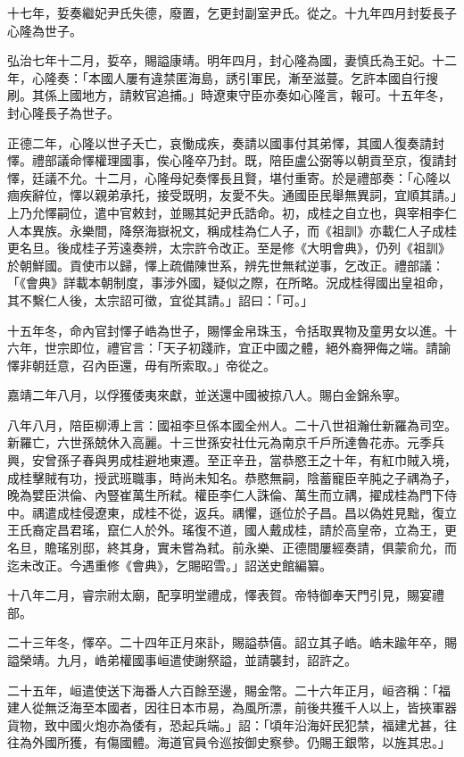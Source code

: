 \begin{pinyinscope}
十七年，娎奏繼妃尹氏失德，廢置，乞更封副室尹氏。從之。十九年四月封娎長子心隆為世子。

弘治七年十二月，娎卒，賜謚康靖。明年四月，封心隆為國，妻慎氏為王妃。十二年，心隆奏：「本國人屢有違禁匿海島，誘引軍民，漸至滋蔓。乞許本國自行搜刷。其係上國地方，請敕官追捕。」時遼東守臣亦奏如心隆言，報可。十五年冬，封心隆長子為世子。

正德二年，心隆以世子夭亡，哀慟成疾，奏請以國事付其弟懌，其國人復奏請封懌。禮部議命懌權理國事，俟心隆卒乃封。既，陪臣盧公弼等以朝貢至京，復請封懌，廷議不允。十二月，心隆母妃奏懌長且賢，堪付重寄。於是禮部奏：「心隆以痼疾辭位，懌以親弟承托，接受既明，友愛不失。通國臣民舉無異詞，宜順其請。」上乃允懌嗣位，遣中官敕封，並賜其妃尹氏誥命。初，成桂之自立也，與宰相李仁人本異族。永樂間，降祭海嶽祝文，稱成桂為仁人子，而《祖訓》亦載仁人子成桂更名旦。後成桂子芳遠奏辨，太宗許令改正。至是修《大明會典》，仍列《祖訓》於朝鮮國。貢使市以歸，懌上疏備陳世系，辨先世無弒逆事，乞改正。禮部議：「《會典》詳載本朝制度，事涉外國，疑似之際，在所略。況成桂得國出皇祖命，其不繫仁人後，太宗詔可徵，宜從其請。」詔曰：「可。」

十五年冬，命內官封懌子峼為世子，賜懌金帛珠玉，令括取異物及童男女以進。十六年，世宗即位，禮官言：「天子初踐祚，宜正中國之體，絕外裔狎侮之端。請諭懌非朝廷意，召內臣還，毋有所索取。」帝從之。

嘉靖二年八月，以俘獲倭夷來獻，並送還中國被掠八人。賜白金錦糸寧。

八年八月，陪臣柳溥上言：國祖李旦係本國全州人。二十八世祖瀚仕新羅為司空。新羅亡，六世孫兢休入高麗。十三世孫安社仕元為南京千戶所達魯花赤。元季兵興，安曾孫子春與男成桂避地東遷。至正辛丑，當恭愍王之十年，有紅巾賊入境，成桂擊賊有功，授武班職事，時尚未知名。恭愍無嗣，陰蓄寵臣辛肫之子禑為子，晚為嬖臣洪倫、內豎崔萬生所弒。權臣李仁人誅倫、萬生而立禑，擢成桂為門下侍中。禑遣成桂侵遼東，成桂不從，返兵。禑懼，遜位於子昌。昌以偽姓見黜，復立王氏裔定昌君瑤，竄仁人於外。瑤復不道，國人戴成桂，請於高皇帝，立為王，更名旦，贍瑤別邸，終其身，實未嘗為弒。前永樂、正德間屢經奏請，俱蒙俞允，而迄未改正。今遇重修《會典》，乞賜昭雪。」詔送史館編纂。

十八年二月，睿宗祔太廟，配享明堂禮成，懌表賀。帝特御奉天門引見，賜宴禮部。

二十三年冬，懌卒。二十四年正月來訃，賜謚恭僖。詔立其子峼。峼未踰年卒，賜謚榮靖。九月，峼弟權國事峘遣使謝祭謚，並請襲封，詔許之。

二十五年，峘遣使送下海番人六百餘至邊，賜金幣。二十六年正月，峘咨稱：「福建人從無泛海至本國者，因往日本市易，為風所漂，前後共獲千人以上，皆挾軍器貨物，致中國火炮亦為倭有，恐起兵端。」詔：「頃年沿海奸民犯禁，福建尤甚，往往為外國所獲，有傷國體。海道官員令巡按御史察參。仍賜王銀幣，以旌其忠。」


\end{pinyinscope}
